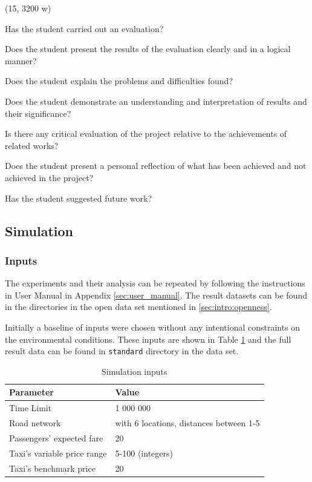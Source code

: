 (15, 3200 w)

Has the student carried out an evaluation?

Does the student present the results of the evaluation clearly and in a logical
manner?

Does the student explain the problems and difficulties found?

Does the student demonstrate an understanding and interpretation of results and
their significance?

Is there any critical evaluation of the project relative to the achievements of
related works?

Does the student present a personal reflection of what has been achieved and
not achieved in the project?

Has the student suggested future work?


\subsection{Simulation}



\subsubsection{Inputs}

The experiments and their analysis can be repeated by following the
instructions in User Manual in Appendix \ref{sec:user_manual}. The result
datasets can be found in the directories in the open data set mentioned in
\ref{sec:intro:openness}.

Initially a baseline of inputs were chosen without any intentional constraints
on the environmental conditions. These inputs are shown in Table
\ref{table:input_data} and the full result data can be found in
\texttt{standard} directory in the data set.

\begin{table}
\begin{tabular}{ | l | l | }
  \hline
  Parameter & Value \\ \hline
  Time Limit & 1 000 000 \\
  Road network & with 6 locations, distances between 1-5 \\
  Passengers' expected fare & 20 \\
  Taxi's variable price range & 5-100 (integers) \\
  Taxi's benchmark price & 20 \\
  \hline
\end{tabular}
\caption{
  Simulation inputs
  \label{table:input_data}
}
\end{table}

